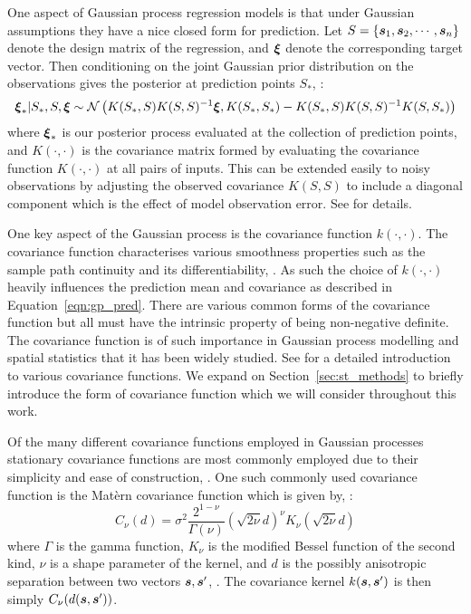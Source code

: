 One aspect of Gaussian process regression models is that under Gaussian assumptions they have a nice closed form for prediction. Let $S = \{ \bm{{s}}_{1}, \bm{{s}}_{2}, \cdots, \bm{{s}}_{n}\}$ denote the design matrix of the regression, and $\bm{{\xi}}$ denote the corresponding target vector.
Then conditioning on the joint Gaussian prior distribution on the observations gives the posterior at prediction points $S_*$, \citep{williams_gaussian_2006}:
\begin{equation}\label{eqn:gp_pred}
	\bm{{\xi}}_{*} | S_{*}, S, \bm{{\xi}} \sim \mathcal{N}\left(K(S_*, S)K(S, S)^{-1} \bm{{\xi}}, K(S_*, S_*) - K(S_*, S)K(S, S)^{-1}K(S, S_*)\right)
\end{equation}
where $\bm{{\xi}}_{*}$ is our posterior process evaluated at the collection of prediction points, and $K(\cdot, \cdot)$ is the covariance matrix formed by evaluating the covariance function $K(\cdot, \cdot)$ at all pairs of inputs. This can be extended easily to noisy observations by adjusting the observed covariance $K(S, S)$ to include a diagonal component which is the effect of model observation error. See \citep{williams_gaussian_2006} for details.


One key aspect of the Gaussian process is the covariance function $k(\cdot, \cdot)$.
The covariance function characterises various smoothness properties such as the sample path continuity and its differentiability, \citep{williams_gaussian_2006}.
As such the choice of $k(\cdot, \cdot)$ heavily influences the prediction mean and covariance as described in Equation~\eqref{eqn:gp_pred}.
There are various common forms of the covariance function but all must have the intrinsic property of being non-negative definite.
The covariance function is of such importance in Gaussian process modelling and spatial statistics that it has been widely studied.
See \citep[Chapter~4]{williams_gaussian_2006} for a detailed introduction to various covariance functions. We expand on Section~\ref{sec:st_methods} to briefly introduce the form of covariance function which we will consider throughout this work. 

Of the many different covariance functions employed in Gaussian processes stationary covariance functions are most commonly employed due to their simplicity and ease of construction, \citep{cressie_statistics_2010}.
One such commonly used covariance function is the Mat\`{e}rn covariance function which is given by, \citep{abramowitz_handbook_2013}: 
\begin{equation}\label{eqn:mat}
	C_\nu(d) = \sigma^2 \frac{2^{1-\nu}}{\Gamma(\nu)} \left(\sqrt{2\nu}d\right)^\nu K_\nu \left( \sqrt{2\nu}d \right) 
\end{equation}
where $\Gamma$ is the gamma function, $K_\nu$ is the modified Bessel function of the second kind, $\nu$ is a shape parameter of the kernel, and $d$ is the possibly anisotropic separation between two vectors $\bm{{s}}, \bm{{s}}^{\prime}$, \citep{abramowitz_handbook_2013}. 
The covariance kernel $k(\bm{{s}}, \bm{{s}}^{\prime})$ is then simply $C_\nu(d(\bm{{s}}, \bm{{s}}^{\prime}))$. 

